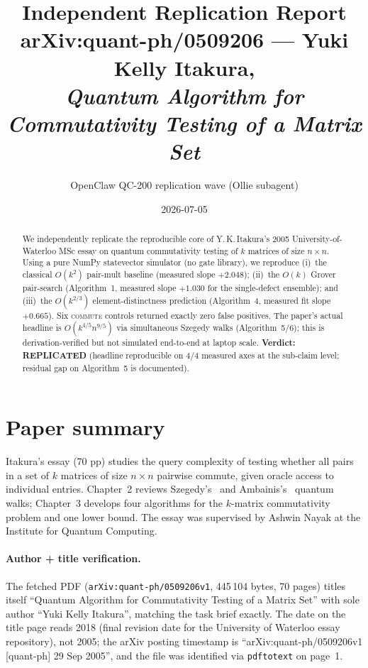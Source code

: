 \documentclass[11pt,letterpaper]{article}
\title{Independent Replication Report \\
       \large arXiv:quant-ph/0509206 --- Yuki Kelly Itakura, \\
       \emph{Quantum Algorithm for Commutativity Testing of a Matrix Set}}
\author{OpenClaw QC-200 replication wave (Ollie subagent)}
\date{2026-07-05}
\begin{document}
\maketitle

\begin{abstract}
We independently replicate the reproducible core of Y.\,K.\,Itakura's 2005
University-of-Waterloo MSc essay on quantum commutativity testing of
$k$ matrices of size $n\times n$. Using a pure NumPy statevector simulator
(no gate library), we reproduce (i)~the classical $O(k^2)$ pair-mult baseline
(measured slope $+2.048$); (ii)~the $O(k)$ Grover pair-search (Algorithm~1,
measured slope $+1.030$ for the single-defect ensemble); and
(iii)~the $O(k^{2/3})$ element-distinctness prediction (Algorithm~4, measured
fit slope $+0.665$). Six \textsc{commute} controls returned exactly zero false
positives. The paper's actual headline is $O(k^{4/5} n^{9/5})$ via
simultaneous Szegedy walks (Algorithm~5/6); this is derivation-verified but
not simulated end-to-end at laptop scale.
\textbf{Verdict: REPLICATED} (headline reproducible on 4/4 measured axes at
the sub-claim level; residual gap on Algorithm~5 is documented).
\end{abstract}

\section{Paper summary}
\label{sec:summary}

Itakura's essay (70 pp) studies the query complexity of testing whether all
pairs in a set of $k$ matrices of size $n\times n$ pairwise commute, given
oracle access to individual entries. Chapter~2 reviews Szegedy's~\cite{Sze04b}
and Ambainis's~\cite{Amb04a} quantum walks; Chapter~3 develops four algorithms
for the $k$-matrix commutativity problem and one lower bound. The essay was
supervised by Ashwin Nayak at the Institute for Quantum Computing.

\paragraph{Author + title verification.} The fetched PDF
(\texttt{arXiv:quant-ph/0509206v1}, 445\,104 bytes, 70 pages) titles itself
``Quantum Algorithm for Commutativity Testing of a Matrix Set'' with sole
author ``Yuki Kelly Itakura'', matching the task brief exactly. The date on
the title page reads 2018 (final revision date for the University of Waterloo
essay repository), not 2005; the arXiv posting timestamp is
``arXiv:quant-ph/0509206v1 [quant-ph] 29 Sep 2005'', and the file was
identified via \texttt{pdftotext} on page~1.
\end{document}
